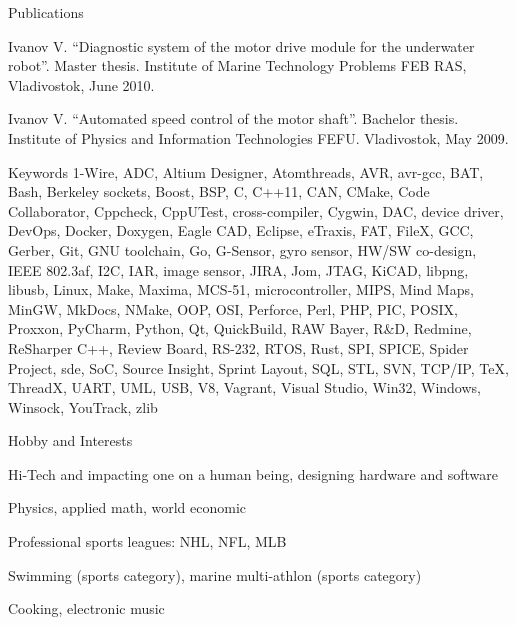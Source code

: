 \documentclass{template}
\begin{document}

\begin{rSection}{Publications}
\begin{rItemize}
\item Ivanov V. \textquotedblleft Diagnostic system of the motor drive module for the underwater robot\textquotedblright. Master thesis. Institute of Marine Technology Problems FEB RAS, Vladivostok, June 2010.
\item Ivanov V. \textquotedblleft Automated speed control of the motor shaft\textquotedblright. Bachelor thesis. \newline Institute of Physics and Information Technologies FEFU. Vladivostok, May 2009.
\end{rItemize}
\end{rSection}


\begin{rSection}{Keywords}
1-Wire, ADC, Altium Designer, Atomthreads, AVR, avr-gcc, BAT, Bash, Berkeley sockets, Boost, BSP, C, C++11, CAN, CMake, Code Collaborator, Cppcheck, CppUTest, cross-compiler, Cygwin, DAC, device driver, DevOps, Docker, Doxygen, Eagle CAD, Eclipse, eTraxis, FAT, FileX, GCC, Gerber, Git, GNU toolchain, Go, G-Sensor, gyro sensor, HW/SW co-design, IEEE 802.3af, I2C, IAR, image sensor, JIRA, Jom, JTAG, KiCAD, libpng, libusb, Linux, Make, Maxima, MCS-51, microcontroller, MIPS, Mind Maps, MinGW, MkDocs, NMake, OOP, OSI, Perforce, Perl, PHP, PIC, POSIX, Proxxon, PyCharm, Python, Qt, QuickBuild, RAW Bayer, R\&D, Redmine, ReSharper C++, Review Board, RS-232, RTOS, Rust, SPI, SPICE, Spider Project, sde, SoC, Source Insight, Sprint Layout, SQL, STL, SVN, TCP/IP, \TeX, ThreadX, UART, UML, USB, V8, Vagrant, Visual Studio, Win32, Windows, Winsock, YouTrack, zlib
\end{rSection}


\begin{rSection}{Hobby and Interests}
\begin{rHobby}
\item Hi-Tech and impacting one on a human being, designing hardware and software
\item Physics, applied math, world economic
\item Professional sports leagues: NHL, NFL, MLB
\item Swimming (sports category), marine multi-athlon (sports category)
\item Cooking, electronic music
\end{rHobby}
\end{rSection}
\end{document}
